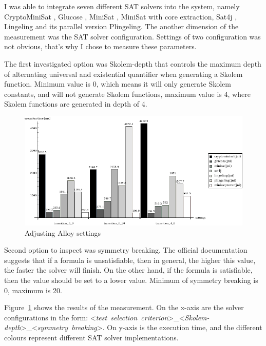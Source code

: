 I was able to integrate seven different SAT solvers into the system, namely CryptoMiniSat \cite{cryptominisat}, Glucose \cite{glucose}, MiniSat \cite{minisat}, MiniSat with core extraction, Sat4j \cite{sat4j}, Lingeling \cite{lingeling} and its parallel version Plingeling. The another dimension of the measurement was the SAT solver configuration. Settings of two configuration was not obvious, that's why I chose to measure these parameters.

The first investigated option was Skolem-depth that controls the maximum depth of alternating universal and existential quantifier when generating a Skolem function. Minimum value is 0, which means it will only generate Skolem constants, and will not generate Skolem functions, maximum value is 4, where Skolem functions are generated in depth of 4.

\begin{figure}[htp]
\centering
\includegraphics[scale=0.55]{figures/measurements_alloy_settings}
\caption{Adjusting Alloy settings}
\label{fig:measurements_alloy_settings}
\end{figure}

Second option to inspect was symmetry breaking. The official documentation suggests that  if a formula is unsatisfiable, then in general, the higher this value, the faster the solver will finish. On the other hand, if the formula is satisfiable, then the value should be set to a lower value. Minimum of symmetry breaking is 0, maximum is 20.

Figure~\ref{fig:measurements_alloy_settings} shows the results of the measurement. On the x-axis are the solver configurations in the form: \mbox{<\textit{test selection criterion}>\_<\textit{Skolem-depth}>\_<\textit{symmetry breaking}>}. On y-axis is the execution time, and the different colours represent different SAT solver implementations.

